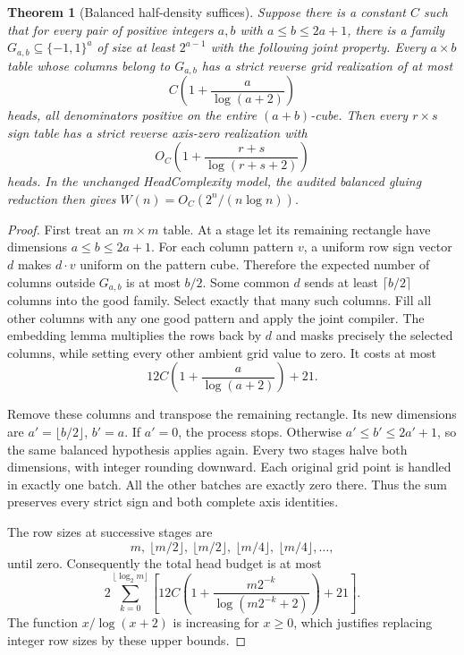 \documentclass[11pt]{article}
\newtheorem{theorem}{Theorem}
\begin{document}
\begin{theorem}[Balanced half-density suffices]
Suppose there is a constant $C$ such that for every pair of positive
integers $a,b$ with $a\leq b\leq2a+1$, there is a family
$G_{a,b}\subseteq\{-1,1\}^a$ of size at least $2^{a-1}$ with the
following joint property. Every $a\times b$ table whose columns belong
to $G_{a,b}$ has a strict reverse grid realization of at most
\[
 C\left(1+\frac{a}{\log(a+2)}\right)
\]
heads, all denominators positive on the entire $(a+b)$-cube.
Then every $r\times s$ sign table has a strict reverse axis-zero
realization with
\[
 O_C\left(1+\frac{r+s}{\log(r+s+2)}\right)
\]
heads. In the unchanged HeadComplexity model, the audited balanced
gluing reduction then gives $W(n)=O_C(2^n/(n\log n))$.
\end{theorem}
\begin{proof}
First treat an $m\times m$ table. At a stage let its remaining rectangle
have dimensions $a\leq b\leq2a+1$. For each column pattern $v$, a
uniform row sign vector $d$ makes $d\cdot v$ uniform on the pattern
cube. Therefore the expected number of columns outside $G_{a,b}$ is
at most $b/2$. Some common $d$ sends at least $\lceil b/2\rceil$
columns into the good family. Select exactly that many such columns.
Fill all other columns with any one good pattern and apply the joint
compiler. The embedding lemma multiplies the rows back by $d$ and
masks precisely the selected columns, while setting every other
ambient grid value to zero. It costs at most
\[
 12C\left(1+\frac{a}{\log(a+2)}\right)+21.
\]

Remove these columns and transpose the remaining rectangle. Its new
dimensions are $a'=\lfloor b/2\rfloor$, $b'=a$. If $a'=0$, the process
stops. Otherwise $a'\leq b'\leq2a'+1$, so the same balanced hypothesis
applies again. Every two stages halve both dimensions, with integer
rounding downward. Each original grid point is handled in exactly one
batch. All the other batches are exactly zero there. Thus the sum
preserves every strict sign and both complete axis identities.

The row sizes at successive stages are
\[
 m,\ \lfloor m/2\rfloor,\ \lfloor m/2\rfloor,
 \ \lfloor m/4\rfloor,\ \lfloor m/4\rfloor,\ldots,
\]
until zero. Consequently the total head budget is at most
\[
 2\sum_{k=0}^{\lfloor\log_2m\rfloor}
 \left[12C\left(1+
 \frac{m2^{-k}}{\log(m2^{-k}+2)}\right)+21\right].
 \tag{1}
\]
The function $x/\log(x+2)$ is increasing for $x\geq0$, which justifies
replacing integer row sizes by these upper bounds.


\end{proof}
\end{document}

